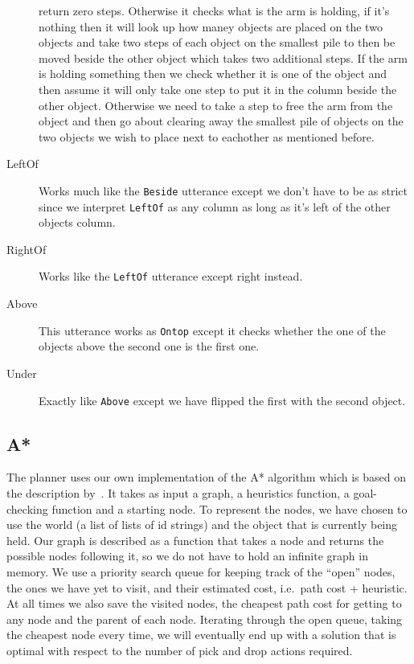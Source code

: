 \begin{description}
    return zero steps. Otherwise it checks what is the arm is holding, if it's
    nothing then it will look up how maney objects are placed on the two objects
    and take two steps of each object on the smallest pile to then be moved
    beside the other object which takes two additional steps. If the arm is
    holding something then we check whether it is one of the object and then
    assume it will only take one step to put it in the column beside the other
    object. Otherwise we need to take a step to free the arm from the object and
    then go about clearing away the smallest pile of objects on the two objects
    we wish to place next to eachother as mentioned before.
  \item[LeftOf] Works much like the \verb|Beside| utterance except we don't have
    to be as strict since we interpret \verb|LeftOf| as any column as long as
    it's left of the other objects column.
  \item[RightOf] Works like the \verb|LeftOf| utterance except right instead.
  \item[Above] This utterance works as \verb|Ontop| except it checks whether the
    one of the objects above the second one is the first one.
  \item[Under] Exactly like \verb|Above| except we have flipped the first with
    the second object.
\end{description}

\subsection*{A*}
The planner uses our own implementation of the A* algorithm which is based on the description by~\cite{apath}.
It takes as input a graph, a heuristics function, a goal-checking function and a starting node.
To represent the nodes, we have chosen to use the world (a list of lists of id strings) and the object that is currently being held.
Our graph is described as a function that takes a node and returns the possible nodes following it, so we do not have to hold an infinite graph in memory.
We use a priority search queue for keeping track of the ``open'' nodes, the ones we have yet to visit, and their estimated cost, i.e.\ path cost + heuristic.
At all times we also save the visited nodes, the cheapest path cost for getting to any node and the parent of each node.
Iterating through the open queue, taking the cheapest node every time, we will eventually end up with a solution that is optimal with respect to the number of pick and drop actions required.


